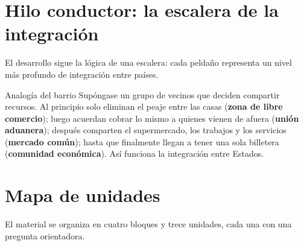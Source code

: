 \documentclass[12pt,oneside]{book}
\begin{document}
\section{Hilo conductor: la escalera de la integración}

El desarrollo sigue la lógica de una escalera: cada peldaño representa un nivel más profundo de integración entre países.

\begin{example}{Analogía del barrio}
Supóngase un grupo de vecinos que deciden compartir recursos. Al principio solo eliminan el peaje entre las casas (\textbf{zona de libre comercio}); luego acuerdan cobrar lo mismo a quienes vienen de afuera (\textbf{unión aduanera}); después comparten el supermercado, los trabajos y los servicios (\textbf{mercado común}); hasta que finalmente llegan a tener una sola billetera (\textbf{comunidad económica}). Así funciona la integración entre Estados.
\end{example}

\section{Mapa de unidades}

El material se organiza en cuatro bloques y trece unidades, cada una con una pregunta orientadora.

\end{document}
